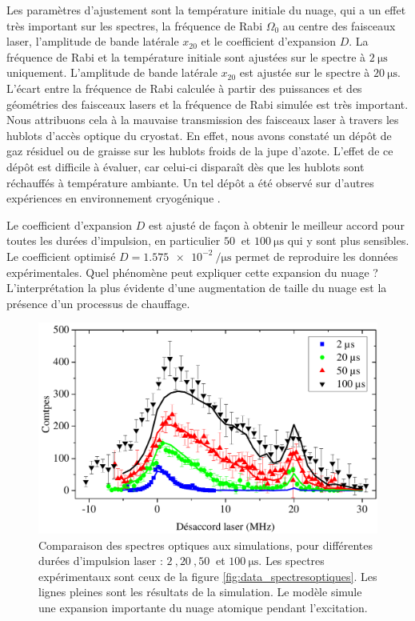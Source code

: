 Les paramètres d'ajustement sont la température initiale du nuage, qui a un effet très important sur les spectres, la fréquence de Rabi $\Omega_0$ au centre des faisceaux laser, l'amplitude de bande latérale $x_{20}$ et le coefficient d'expansion $D$.
La fréquence de Rabi et la température initiale sont ajustées sur le spectre à $\SI{2}{\us}$ uniquement.
L'amplitude de bande latérale $x_{20}$ est ajustée sur le spectre à $\SI{20}{\us}$.
L'écart entre la fréquence de Rabi calculée à partir des puissances et des géométries des faisceaux lasers et la fréquence de Rabi simulée est très important.
Nous attribuons cela à la mauvaise transmission des faisceaux laser à travers les hublots d'accès optique du cryostat.
En effet, nous avons constaté un dépôt de gaz résiduel ou de graisse sur les hublots froids de la jupe d'azote.
L'effet de ce dépôt est difficile à évaluer, car celui-ci disparaît dès que les hublots sont réchauffés à température ambiante.
Un tel dépôt a été observé sur d'autres expériences en environnement cryogénique \cite{PHD_LEUPOLD_ETHZ}.

Le coefficient d'expansion $D$ est ajusté de façon à obtenir le meilleur accord pour toutes les durées d'impulsion, en particulier $\SI{50}{}$ et $\SI{100}{\us}$ qui y sont plus sensibles.
Le coefficient optimisé $D = \SI{1.575e-2}{\per\us}$ permet de reproduire les données expérimentales.
Quel phénomène peut expliquer cette expansion du nuage ?
L'interprétation la plus évidente d'une augmentation de taille du nuage est la présence d'un processus de chauffage.
 
\begin{figure}[h]
\centering
\includegraphics[width=\linewidth]{figures/low_l/fitsim_spectresoptiques_0830126}
\caption[Comparaison des spectres optiques aux simulations avec équations de taux]{
Comparaison des spectres optiques aux simulations, pour différentes durées d'impulsion laser : $\SI{2}{},\SI{20}{},\SI{50}{}$ et $\SI{100}{\us}$.
Les spectres expérimentaux sont ceux de la figure \ref{fig:data_spectresoptiques}.
Les lignes pleines sont les résultats de la simulation.
Le modèle simule une expansion importante du nuage atomique pendant l'excitation.
}
\label{fig:fitsim_spectresoptiques_0830126}
\end{figure}

